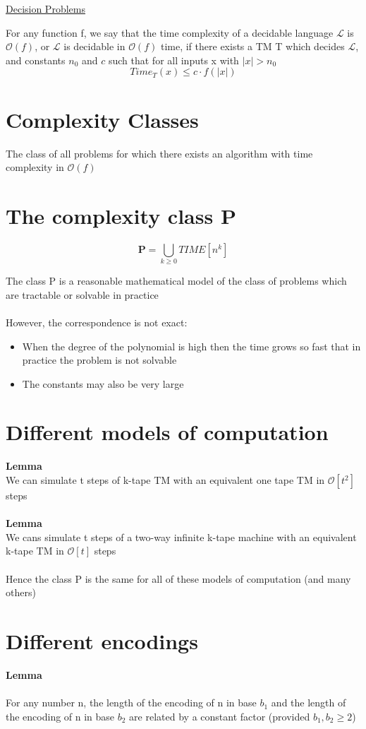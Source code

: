 \documentclass{article}[18pt]
\begin{document}
\begin{center}
\underline{\huge Decision Problems}
\end{center}
\begin{definition}
	For any function f, we say that the time complexity of a decidable language $\mathscr{L}$ is $\mathcal{O}(f)$, or $\mathscr{L}$ is decidable in $\mathcal{O}(f)$ time, if there exists a TM T which decides $\mathscr{L}$, and constants $n_0$ and $c$ such that for all inputs x with $|x|>n_0$
	$$Time_T(x)\leqslant c\cdot f(|x|)$$
\end{definition}
\section{Complexity Classes}
\begin{definition}
	The class of all problems for which there exists an algorithm with time complexity in $\mathcal{O}(f)$
\end{definition}
\section{The complexity class P}
\begin{definition}[P]
$$
\mathbf{P}=\bigcup_{k \geq 0} T I M E\left[n^{k}\right]
$$
\end{definition}
The class P is a reasonable mathematical model of the class of problems which are tractable or solvable in practice\\
\\
However, the correspondence is not exact:
\begin{itemize}
	\item When the degree of the polynomial is high then the time grows so fast that in practice the problem is not solvable
	\item The constants may also be very large
\end{itemize}
\section{Different models of computation}
\textbf{Lemma}\\
We can simulate t steps of k-tape TM with an equivalent one tape TM in $\mathcal{O}[t^2]$ steps\\
\\
\textbf{Lemma}\\
We cans simulate t steps of a two-way infinite k-tape machine with an equivalent k-tape TM in $\mathcal{O}[t]$ steps\\
\\
Hence the class P is the same for all of these models of computation (and many others)
\section{Different encodings}
\textbf{Lemma}\\
\\
For any number n, the length of the encoding of n in base $b_1$ and the length of the encoding of n in base $b_2$ are related by a constant factor (provided $b_1,b_2\geqslant 2$)
\end{document}
